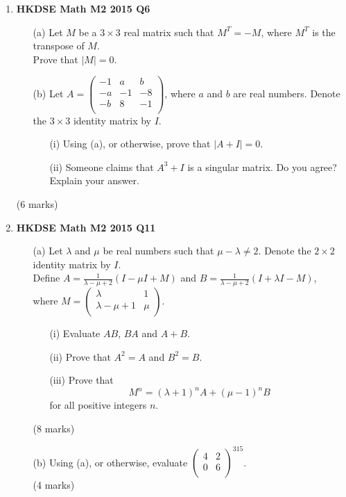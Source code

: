 \documentclass{report}
\begin{document}
\begin{enumerate}
	\item \textbf{HKDSE Math M2 2015 Q6}
	\begin{enumerate}
		\item [(a)]Let $M$ be a $3 \times 3$ real matrix such that $M^T = -M$, where $M^T$ is the transpose of $M$.\\
		Prove that $|M| = 0$.
		\item [(b)]Let $A = \begin{pmatrix}
			-1&a&b\\
			-a&-1&-8\\
			-b&8&-1\\
		\end{pmatrix}$, where $a$ and $b$ are real numbers. Denote the $3 \times 3$ identity matrix by $I$.
		\begin{enumerate}
			\item [(i)]Using (a), or otherwise, prove that $|A+I| = 0$. 
			\item [(ii)]Someone claims that $A^3 + I$ is a singular matrix. Do you agree? Explain your answer.
		\end{enumerate}
	\end{enumerate}
	(6 marks)

	\item \textbf{HKDSE Math M2 2015 Q11}
	\begin{enumerate}
		\item [(a)]Let $\lambda$ and $\mu$ be real numbers such that $\mu - \lambda \neq 2$. Denote the $2 \times 2$ identity matrix by $I$.\\Define $\displaystyle A = \frac{1}{\lambda - \mu + 2} (I - \mu I + M)$ and $\displaystyle B = \frac{1}{\lambda - \mu + 2} (I +\lambda  I - M)$, \\where $M = \begin{pmatrix}
			\lambda & 1 \\ \lambda - \mu + 1 & \mu \\
		\end{pmatrix}$. 
		\begin{enumerate}
			\item [(i)]Evaluate $AB$, $BA$ and $A+B$. 
			\item [(ii)]Prove that $A^2 = A$ and $B^2 = B$. 
			\item [(iii)]Prove that $$M^n = (\lambda + 1)^nA + (\mu -1)^n B$$ for all positive integers $n$.
		\end{enumerate}
		(8 marks)
		\item [(b)]Using (a), or otherwise, evaluate $\begin{pmatrix}
			4&2\\0&6\\
		\end{pmatrix}^{315}$. \\(4 marks)
	\end{enumerate}


\end{enumerate}
\end{document}
